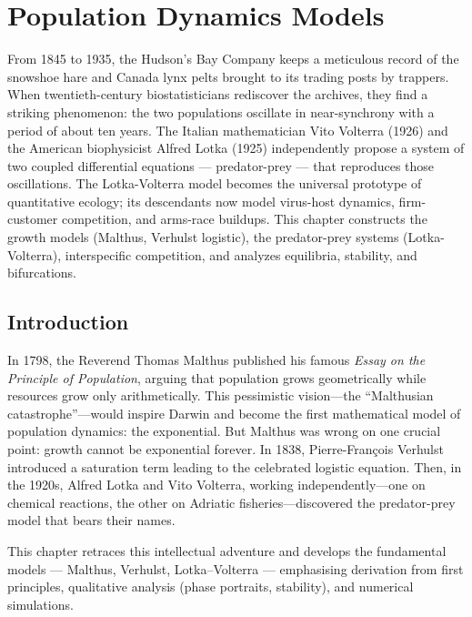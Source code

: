 \chapter{Population Dynamics Models}
\label{ch:populations}

From 1845 to 1935, the Hudson's Bay Company keeps a meticulous record of the snowshoe hare and Canada lynx pelts brought to its trading posts by trappers. When twentieth-century biostatisticians rediscover the archives, they find a striking phenomenon: the two populations oscillate in near-synchrony with a period of about ten years. The Italian mathematician Vito Volterra (1926) and the American biophysicist Alfred Lotka (1925) independently propose a system of two coupled differential equations --- predator-prey --- that reproduces those oscillations. The Lotka-Volterra model becomes the universal prototype of quantitative ecology; its descendants now model virus-host dynamics, firm-customer competition, and arms-race buildups. This chapter constructs the growth models (Malthus, Verhulst logistic), the predator-prey systems (Lotka-Volterra), interspecific competition, and analyzes equilibria, stability, and bifurcations.

\section{Introduction}

In 1798, the Reverend Thomas Malthus published his famous \emph{Essay on the Principle of Population}, arguing that population grows geometrically while resources grow only arithmetically. This pessimistic vision---the ``Malthusian catastrophe''---would inspire Darwin and become the first mathematical model of population dynamics: the exponential. But Malthus was wrong on one crucial point: growth cannot be exponential forever. In 1838, Pierre-Fran\c{c}ois Verhulst introduced a saturation term leading to the celebrated logistic equation. Then, in the 1920s, Alfred Lotka and Vito Volterra, working independently---one on chemical reactions, the other on Adriatic fisheries---discovered the predator-prey model that bears their names.

This chapter retraces this intellectual adventure and develops the fundamental models --- Malthus,
Verhulst, Lotka--Volterra --- emphasising derivation from first
principles, qualitative analysis (phase portraits, stability), and
numerical simulations.

